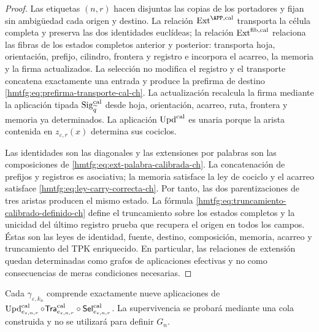 \begin{proof}
Las etiquetas \((n,r)\) hacen disjuntas las copias de los portadores y fijan
sin ambigüedad cada origen y destino. La relación
\(\operatorname{Ext}^{\APP,\rm cal}\) transporta la célula completa y
preserva las dos identidades euclídeas; la relación
\(\operatorname{Ext}^{\rm fib,cal}\) relaciona las fibras de los estados
completos anterior y posterior: transporta hoja, orientación, prefijo,
cilindro, frontera y registro e incorpora el acarreo, la memoria y la firma
actualizados. La selección no modifica el registro y el transporte concatena
exactamente una entrada y produce la prefirma de destino
\eqref{hmtfg:eq:prefirma-transporte-cal-ch}. La actualización recalcula la firma mediante la
aplicación tipada \(\operatorname{Sig}^{\rm cal}_{\widetilde q}\) desde
hoja, orientación, acarreo, ruta, frontera y memoria ya determinados. La aplicación
\(\operatorname{Upd}^{\rm cal}\) es unaria porque la arista contenida en
\(z_{\varepsilon,r}(x)\) determina sus cociclos.

Las identidades son las diagonales y las extensiones por palabras son las
composiciones de \eqref{hmtfg:eq:ext-palabra-calibrada-ch}. La concatenación de
prefijos y registros es asociativa; la memoria satisface la ley de cociclo y
el acarreo satisface
\eqref{hmtfg:eq:ley-carry-correcta-ch}. Por tanto, las dos parentizaciones de tres
aristas producen el mismo estado. La fórmula
\eqref{hmtfg:eq:truncamiento-calibrado-definido-ch} define el truncamiento sobre
los estados completos y la unicidad del último registro prueba que recupera
el origen en todos los campos. Éstas son las leyes de identidad, fuente,
destino, composición, memoria, acarreo y truncamiento del TPK enriquecido.
En particular, las relaciones de extensión quedan determinadas como grafos
de aplicaciones efectivas y no como consecuencias de meras condiciones
necesarias.
\end{proof}

Cada \(\gamma_{\varepsilon,k_n}\) comprende exactamente nueve aplicaciones
de \(\operatorname{Upd}^{\rm cal}_{e_{\varepsilon,n,r}}\circ
\mathsf{Tra}^{\rm cal}_{e_{\varepsilon,n,r}}\circ
\mathsf{Sel}^{\rm cal}_{e_{\varepsilon,n,r}}\). La
supervivencia se probará mediante una cola construida y no se utilizará para
definir \(G_n\).

